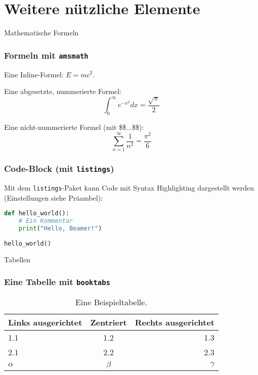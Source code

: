 \section{Weitere nützliche Elemente}

\begin{frame}{Mathematische Formeln}
    \frametitle{Formeln mit \texttt{amsmath}}
    
    Eine Inline-Formel: $E = mc^2$.
    
    Eine abgesetzte, nummerierte Formel:
    \begin{equation}
        \int_0^\infty e^{-x^2} dx = \frac{\sqrt{\pi}}{2}
    \end{equation}
    
    Eine nicht-nummerierte Formel (mit \$\$...\$\$):
    $$ \sum_{n=1}^\infty \frac{1}{n^2} = \frac{\pi^2}{6} $$
\end{frame}

\begin{frame}[fragile] %
    \frametitle{Code-Block (mit \texttt{listings})}
    
    Mit dem \texttt{listings}-Paket kann Code mit Syntax Highlighting
    dargestellt werden (Einstellungen siehe Präambel):
    
    \begin{lstlisting}[language=Python, caption={Ein Python-Beispiel}]
def hello_world():
    # Ein Kommentar
    print("Hello, Beamer!")
    
hello_world()
    \end{lstlisting}
\end{frame}

\begin{frame}{Tabellen}
    \frametitle{Eine Tabelle mit \texttt{booktabs}}
    
    \begin{table}
        \centering
        \begin{tabular}{lcr}
            \toprule
            Links ausgerichtet & Zentriert & Rechts ausgerichtet \\
            \midrule
            1.1 & 1.2 & 1.3 \\
            2.1 & 2.2 & 2.3 \\
            $\alpha$ & $\beta$ & $\gamma$ \\
            \bottomrule
        \end{tabular}
        \caption{Eine Beispieltabelle.}
    \end{table}
\end{frame}

